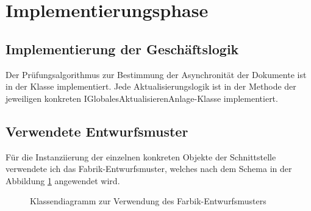 \clearpage
\section{Implementierungsphase} 
\label{sec:Implementierungsphase}

\subsection{Implementierung der Geschäftslogik}
\label{sec:ImplementierungGeschaeftslogik}

Der Prüfungsalgorithmus zur Bestimmung der Asynchronität der Dokumente ist in der Klasse   implementiert.
Jede Aktualisierungslogik ist in der Methode  der jeweiligen konkreten I\-Glo\-ba\-les\-Ak\-tu\-a\-li\-sie\-ren\-An\-la\-ge-Klasse implementiert.

\subsection{Verwendete Entwurfsmuster}
\label{sec:Entwurfsmuster}

Für die Instanziierung der einzelnen konkreten Objekte der Schnittstelle  verwendete ich das Fabrik-Entwurfsmuster, welches nach dem Schema in der Abbildung \ref{fig:FactoryPattern} angewendet wird.

\begin{figure}[h]
	\centering
	\caption{Klassendiagramm zur Verwendung des Farbik-Entwurfsmusters}
	\label{fig:FactoryPattern}
\end{figure}

